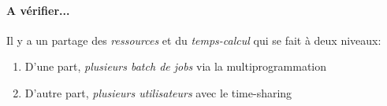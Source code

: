 {\paragraph{A vérifier...}
Il y a un partage des \textit{ressources} et du \textit{temps-calcul} qui se fait à deux niveaux:
\begin{enumerate}
\item D'une part, \textit{plusieurs batch de jobs} via la multiprogrammation
\item D'autre part, \textit{plusieurs utilisateurs} avec le time-sharing
\end{enumerate}
}


\item{}
